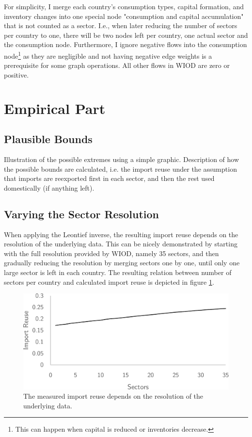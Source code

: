 \documentclass[english]{uzhpub}
\begin{document}
For simplicity, I merge each country's consumption types, capital formation, and inventory changes into one special node "consumption and capital accumulation" that is not counted as a sector. I.e., when later reducing the number of sectors per country to one, there will be two nodes left per country, one actual sector and the consumption node. Furthermore, I ignore negative flows into the consumption node\footnote{This can happen when capital is reduced or inventories decrease.} as they are negligible and not having negative edge weights is a prerequisite for some graph operations. All other flows in WIOD are zero or positive.

\section{Empirical Part}

\subsection{Plausible Bounds}
Illustration of the possible extremes using a simple graphic. Description of how the possible bounds are calculated, i.e. the import reuse under the assumption that imports are reexported first in each sector, and then the rest used domestically (if anything left).

\subsection{Varying the Sector Resolution}
When applying the Leontief inverse, the resulting import reuse depends on the resolution of the underlying data. This can be nicely demonstrated by starting with the full resolution provided by WIOD, namely 35 sectors, and then gradually reducing the resolution by merging sectors one by one, until only one large sector is left in each country. The resulting relation between number of sectors per country and calculated import reuse is depicted in figure \ref{fig:resolution}.

\begin{figure}
\centering
\includegraphics[scale=0.5]{../data/resolution}
\caption{The measured import reuse depends on the resolution of the underlying data.} \label{fig:resolution}
\end{figure}
\end{document}
